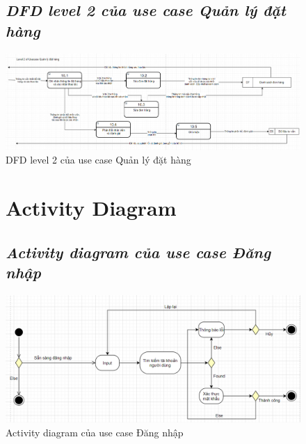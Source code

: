 \documentclass{report}
\begin{document}
\begin{figure}[htp]
    \subsection{\textit{DFD level 2 của use case Quản lý đặt hàng}}
    \centering
    \includegraphics[scale = 0.45]{image/DFD_level2_qldathang.PNG}
    \caption{DFD level 2 của use case Quản lý đặt hàng}
\end{figure}


\begin{figure}[htp]
    \section{Activity Diagram}
    \subsection{\textit{Activity diagram của use case Đăng nhập}}
    \centering
    \includegraphics[scale = 0.6]{image/activity_dangnhap.PNG}
    \caption{Activity diagram của use case Đăng nhập}
\end{figure}
\end{document}
